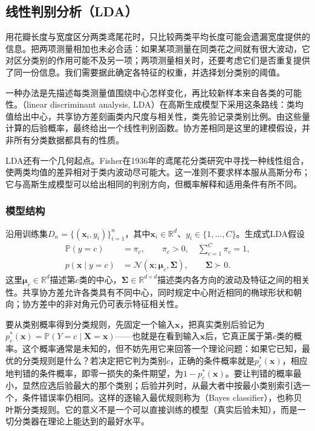 \subsection{线性判别分析（LDA）}
\label{sec:classification-lda}

用花瓣长度与宽度区分两类鸢尾花时，只比较两类平均长度可能会遗漏宽度提供的信息。把两项测量相加也未必合适：如果某项测量在同类花之间就有很大波动，它对区分类别的作用可能不及另一项；两项测量相关时，还要考虑它们是否重复提供了同一份信息。我们需要据此确定各特征的权重，并选择划分类别的阈值。

一种办法是先描述每类测量值围绕中心怎样变化，再比较新样本来自各类的可能性。（linear discriminant analysis, LDA）在高斯生成模型下采用这条路线：类均值给出中心，共享协方差刻画类内尺度与相关性，类先验记录类别比例。由这些量计算的后验概率，最终给出一个线性判别函数。协方差相同是这里的建模假设，并非所有分类数据都具有的性质。

LDA还有一个几何起点。Fisher在1936年的鸢尾花分类研究中寻找一种线性组合，使两类均值的差异相对于类内波动尽可能大。这一准则不要求样本服从高斯分布；它与高斯生成模型可以给出相同的判别方向，但概率解释和适用条件有所不同。

\subsubsection{模型结构}
\label{sec:classification-lda-model}

沿用训练集$D_n=\{(\bm{x}_i,y_i)\}_{i=1}^{n}$，其中$\bm{x}_i\in\mathbb{R}^{d}$、$y_i\in\{1,\ldots,C\}$。生成式LDA假设
\begin{equation}
  \label{eq:classification-lda-distribution}
  \begin{aligned}
    \mathbb{P}(y=c)&=\pi_c,\qquad \pi_c>0,\quad
      \sum_{c=1}^{C}\pi_c=1,\\
    p(\bm{x}\mid y=c)&=\mathcal{N}(\bm{x};\bm{\mu}_c,\bm{\Sigma}),
      \qquad \bm{\Sigma}\succ0 .
  \end{aligned}
\end{equation}
这里$\bm{\mu}_c\in\mathbb{R}^{d}$描述第$c$类的中心，$\bm{\Sigma}\in\mathbb{R}^{d\times d}$描述类内各方向的波动及特征之间的相关性。共享协方差允许各类具有不同中心，同时规定中心附近相同的椭球形状和朝向；协方差中的非对角元仍可表示特征相关性。

要从类别概率得到分类规则，先固定一个输入$\bm x$，把真实类别后验记为$p_c^\ast(\bm x)=\mathbb P(Y=c\mid\bm X=\bm x)$——也就是在看到输入$\bm x$后，它真正属于第$c$类的概率。这个概率通常是未知的，但不妨先用它来回答一个理论问题：如果它已知，最优的分类规则是什么？若决定把它判为类别$c$，正确的条件概率就是$p_c^\ast(\bm x)$，相应地判错的条件概率，即零一损失的条件期望，为$1-p_c^\ast(\bm x)$。要让判错的概率最小，显然应选后验最大的那个类别；后验并列时，从最大者中按最小类别索引选一个，条件错误率仍相同。这样的逐输入最优规则称为（Bayes classifier），也称贝叶斯分类规则。它的意义不是一个可以直接训练的模型（真实后验未知），而是一切分类器在理论上能达到的最好水平。

